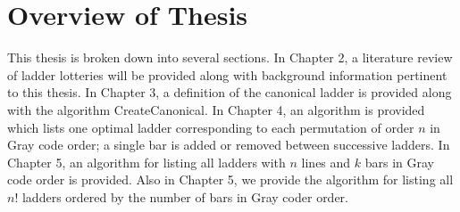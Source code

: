 \section{Overview of Thesis}
This thesis is broken down into several sections. In Chapter 2, a literature
review of ladder lotteries will be provided along with background information pertinent to this thesis. 
In Chapter 3, a definition of the canonical ladder is provided 
along with the algorithm {\sc CreateCanonical}. 
In Chapter 4, an algorithm is provided which lists one optimal ladder corresponding to each permutation of order $n$ in Gray code order; 
a single bar is added or removed between successive ladders. 
In Chapter 5, an algorithm for listing all ladders with $n$ lines and $k$ bars in Gray code order is provided. 
Also in Chapter 5, we provide the algorithm for listing all $n!$ ladders ordered by the number of bars in Gray coder order. 